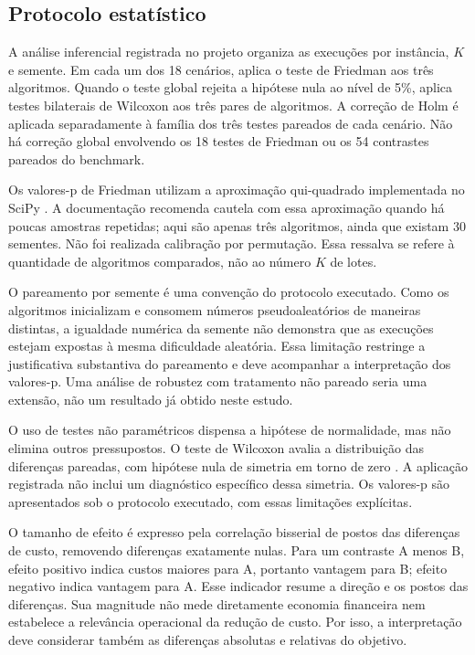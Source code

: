 \documentclass[12pt,a4paper]{article}
\begin{document}
\subsection{Protocolo estatístico}
\label{subsec:estatistica}

A análise inferencial registrada no projeto organiza as execuções por instância, $K$ e
semente. Em cada um dos 18 cenários, aplica o teste de Friedman \cite{friedman1937} aos três algoritmos.
Quando o teste global rejeita a hipótese nula ao nível de 5\%, aplica testes bilaterais
de Wilcoxon aos três pares de algoritmos. A correção de Holm \cite{holm1979} é aplicada separadamente à
família dos três testes pareados de cada cenário. Não há correção global envolvendo os
18 testes de Friedman ou os 54 contrastes pareados do benchmark.

Os valores-p de Friedman utilizam a aproximação qui-quadrado implementada no SciPy \cite{scipyfriedman}. A
documentação recomenda cautela com essa aproximação quando há poucas amostras repetidas;
aqui são apenas três algoritmos, ainda que existam 30 sementes. Não foi realizada
calibração por permutação. Essa ressalva se refere à quantidade de algoritmos
comparados, não ao número $K$ de lotes.

O pareamento por semente é uma convenção do protocolo executado. Como os algoritmos
inicializam e consomem números pseudoaleatórios de maneiras distintas, a igualdade
numérica da semente não demonstra que as execuções estejam expostas à mesma dificuldade
aleatória. Essa limitação restringe a justificativa substantiva do pareamento e deve
acompanhar a interpretação dos valores-p. Uma análise de robustez com tratamento não
pareado seria uma extensão, não um resultado já obtido neste estudo.

O uso de testes não paramétricos dispensa a hipótese de normalidade, mas não elimina
outros pressupostos. O teste de Wilcoxon avalia a distribuição das diferenças pareadas,
com hipótese nula de simetria em torno de zero \cite{scipywilcoxon}. A aplicação registrada não inclui um
diagnóstico específico dessa simetria. Os valores-p são apresentados sob o protocolo
executado, com essas limitações explícitas.

O tamanho de efeito é expresso pela correlação bisserial de postos das diferenças de
custo, removendo diferenças exatamente nulas. Para um contraste A menos B, efeito
positivo indica custos maiores para A, portanto vantagem para B; efeito negativo indica
vantagem para A. Esse indicador resume a direção e os postos das diferenças. Sua
magnitude não mede diretamente economia financeira nem estabelece a relevância
operacional da redução de custo. Por isso, a interpretação deve considerar também as
diferenças absolutas e relativas do objetivo.
\end{document}
